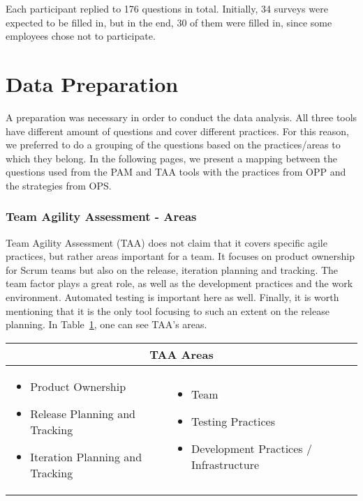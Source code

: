 Each participant replied to 176 questions in total. Initially, 34 surveys were expected to be filled in, but in the end, 30 of them were filled in, since some employees chose not to participate.

\section{Data Preparation}
\label{subsec:data_preparation}
A preparation was necessary in order to conduct the data analysis. All three tools have different amount of questions and cover different practices. For this reason, we preferred to do a grouping of the questions based on the practices/areas to which they belong. In the following pages, we present a mapping between the questions used from the \ac{PAM} and \ac{TAA} tools with the practices from \ac{OPP} and the strategies from \ac{OPS}.

\subsubsection[\ac{TAA} Areas]{Team Agility Assessment - Areas}
Team Agility Assessment (\ac{TAA}) does not claim that it covers specific agile practices, but rather areas important for a team. It focuses on product ownership for Scrum teams but also on the release, iteration planning and tracking. The team factor plays a great role, as well as the development practices and the work environment. Automated testing is important here as well. Finally, it is worth mentioning that it is the only tool focusing to such an extent on the release planning. In Table~\ref{table:taa_practices}, one can see \ac{TAA}'s areas.

\begin{table}
  \begin{tabular}{| p{5cm} p{5cm} |}
    \hline
    \multicolumn{2}{|c|}{\textbf{\ac{TAA} Areas}}  \\ \hline
     \begin{itemize} \item Product Ownership \item Release Planning and Tracking \item Iteration Planning and Tracking \end{itemize} &
     \begin{itemize}  \item Team \item Testing Practices \item Development Practices / Infrastructure \end{itemize}  \\ \hline
  \end{tabular}
  \label{table:taa_practices}
\end{table}

